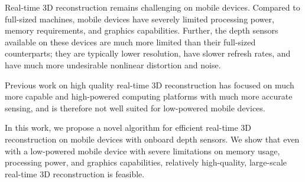\documentclass[conference,10pt]{IEEEtran}
\begin{document}
Real-time 3D reconstruction remains challenging on mobile devices. Compared to
full-sized machines, mobile devices have severely limited processing power,
memory requirements, and graphics capabilities. Further, the depth sensors
available on these devices are much more limited than their full-sized
counterparts; they are typically lower resolution, have slower refresh rates,
and have much more undesirable nonlinear distortion and noise.

Previous work on high quality real-time 3D reconstruction has focused on much
more capable and high-powered computing platforms with much more accurate
sensing, and is therefore not well suited for low-powered mobile devices.

In this work, we propose a novel algorithm for efficient real-time 3D
reconstruction on mobile devices with onboard depth sensors. We show that even
with a low-powered mobile device with severe limitations on memory usage, 
processing power, and graphics capabilities, relatively high-quality,
large-scale real-time 3D reconstruction is feasible.
\end{document}
